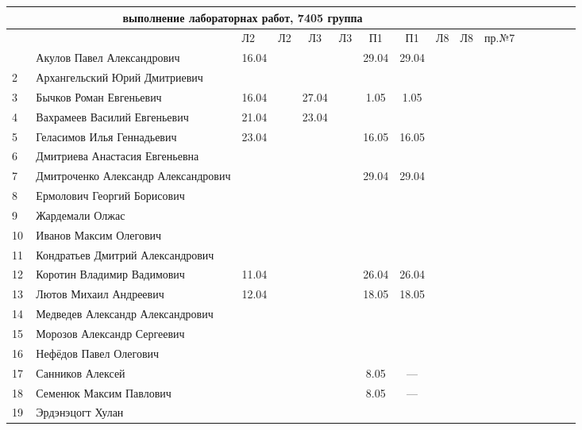 \documentclass[a4paper,11pt]{article}
\begin{document}
\newpage
%
\hspace{-2cm} %
\begin{tabular}{l|llccccccccccccc}
\multicolumn{10}{c}{выполнение лабораторнах работ, 7405 группа} \\
\toprule
&&Л2&Л2& Л3&Л3& П1&П1& Л8&Л8&пр.№7\\
\midrule
\,&Акулов Павел Александрович             &16.04&     &     &     &29.04&29.04&&&\\
2\,&Архангельский Юрий Дмитриевич         &     &     &     &     &&&&\\
3\,&Бычков Роман Евгеньевич               &16.04&     &27.04&     & 1.05& 1.05&&&\\
4\,&Вахрамеев Василий Евгеньевич          &21.04&     &23.04&     &&&&\\
5\,&Геласимов Илья Геннадьевич            &23.04&     &     &     &16.05&16.05&&\\
\midrule
6\,&Дмитриева Анастасия Евгеньевна        &     &     &     &     &&&&\\
7\,&Дмитроченко Александр Александрович   &     &     &     &     &29.04&29.04&&&\\
8\,&Ермолович Георгий Борисович           &     &     &     &     &&&&\\
9\,&Жардемали Олжас                       &     &     &     &     &&&&\\
10\,&Иванов Максим Олегович               &&&&&&&&\\
\midrule
11\,&Кондратьев Дмитрий Александрович     &&&&&&&&\\
12\,&Коротин Владимир Вадимович           &11.04&     &     &     &26.04&26.04&&&\\
13\,&Лютов Михаил Андреевич               &12.04&     &     &     &18.05&18.05&&\\
14\,&Медведев Александр Александрович     &&&&&&&&\\
15\,&Морозов Александр Сергеевич          &&&&&&&&\\
\midrule
16\,&Нефёдов Павел Олегович               &&&&&&&&\\
17\,&Санников Алексей                     &     &     &     &     & 8.05& --- &&&\\
18\,&Семенюк Максим Павлович              &     &     &     &     & 8.05& --- &&&\\
19\,&Эрдэнэцогт Хулан                     &&&&&&&&\\
\bottomrule
\end{tabular}
\end{document}
